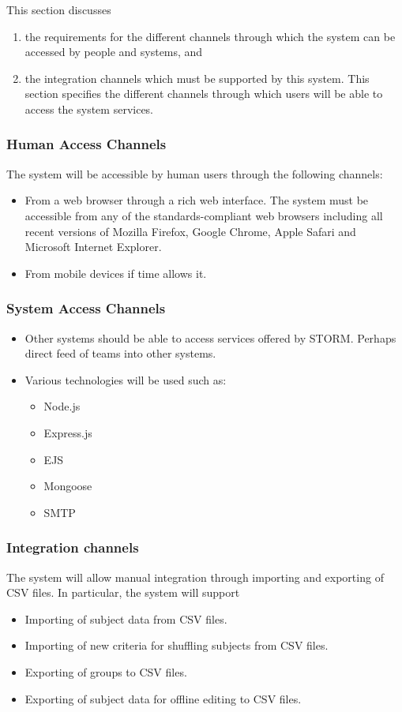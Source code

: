 This section discusses
\begin {enumerate}
\item the requirements for the different channels through which the system can be accessed by
people and systems, and
\item the integration channels which must be supported by this system.
This section specifies the different channels through which users will be able to access the system
services.
\end{enumerate}
\subsubsection{Human Access Channels}
The system will be accessible by human users through the following channels:\par
\begin{itemize}
\item From a web browser through a rich web interface. The system must be accessible from any of the standards-compliant web browsers including all recent versions of Mozilla Firefox, Google Chrome, Apple Safari and Microsoft Internet Explorer.
\item From mobile devices if time allows it.
\end{itemize}
\subsubsection{System Access Channels}
\begin{itemize}
\item Other systems should be able to access services offered by STORM. Perhaps direct feed of teams into other systems.
\item Various technologies will be used such as:
	\begin{itemize}
	\item Node.js
	\item Express.js
	\item EJS
	\item Mongoose
	\item SMTP
	\end{itemize}
\end{itemize}
\subsubsection{Integration channels}
The system will allow manual integration through importing and exporting of CSV
files. In particular, the system will support
\begin{itemize}
\item Importing of subject data from CSV files.
\item Importing of new criteria for shuffling subjects from CSV files.
\item Exporting of groups to CSV files.
\item Exporting of subject data for offline editing to CSV files.
\end{itemize}


